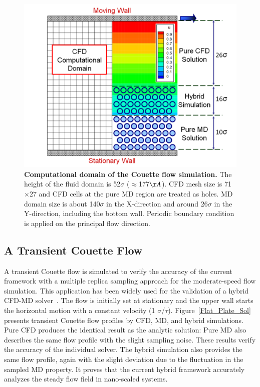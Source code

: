 \documentclass[preprint,12pt]{elsarticle}
\begin{document}
\begin{figure}
\centering
\includegraphics[width=0.8\linewidth]{Couette_Val_Domain.pdf}
\vskip-0.2cm
\caption{\small {\bf Computational domain of the Couette flow simulation.} The height of the fluid domain is 52$\sigma$ ($\approx$177$\AA$). CFD mesh size is 71$\times$27 and CFD cells at the pure MD region are treated as holes. MD domain size is about 140$\sigma$ in the X-direction and around 26$\sigma$ in the Y-direction, including the bottom wall. Periodic boundary condition is applied on the principal flow direction.}
\label{Couette_Val_Domain}
\end{figure}



\subsection{A Transient Couette Flow}
\label{sec:accuracy_couette}

A transient Couette flow is simulated to verify the accuracy of the current framework with a multiple replica sampling approach for the moderate-speed flow simulation. This application has been widely used for the validation of a hybrid CFD-MD solver~\cite{Nie,Yen}. The flow is initially set at stationary and the upper wall starts the horizontal motion with a constant velocity (1 $\sigma$/$\tau$). Figure~\ref{Flat_Plate_Sol} presents transient Couette flow profiles by CFD, MD, and hybrid simulations. Pure CFD produces the identical result as the analytic solution: Pure MD also describes the same flow profile with the slight sampling noise. These results verify the accuracy of the individual solver. The hybrid simulation also provides the same flow profile, again with the slight deviation due to the fluctuation in the sampled MD property. It proves that the current hybrid framework accurately analyzes the steady flow field in nano-scaled systems.
\end{document}
